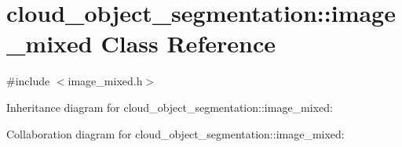 \hypertarget{classcloud__object__segmentation_1_1image__mixed}{}\section{cloud\+\_\+object\+\_\+segmentation\+:\+:image\+\_\+mixed Class Reference}
\label{classcloud__object__segmentation_1_1image__mixed}


{\ttfamily \#include $<$image\+\_\+mixed.\+h$>$}



Inheritance diagram for cloud\+\_\+object\+\_\+segmentation\+:\+:image\+\_\+mixed\+:


Collaboration diagram for cloud\+\_\+object\+\_\+segmentation\+:\+:image\+\_\+mixed\+:
